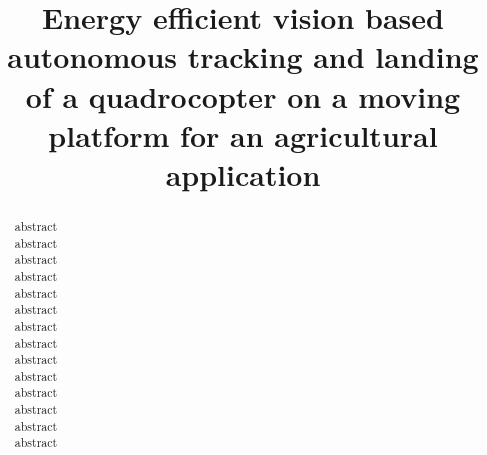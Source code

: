 \documentclass[conference]{IEEEtran}
\begin{document}
\title{Energy efficient vision based autonomous tracking and landing of a quadrocopter on a moving platform for an agricultural application}

\author{
}

\maketitle


\begin{abstract}

abstract\\
abstract\\
abstract\\
abstract\\
abstract\\
abstract\\
abstract\\
abstract\\
abstract\\
abstract\\
abstract\\
abstract\\
abstract\\
abstract

\end{abstract}

%
\IEEEpeerreviewmaketitle

\end{document}
